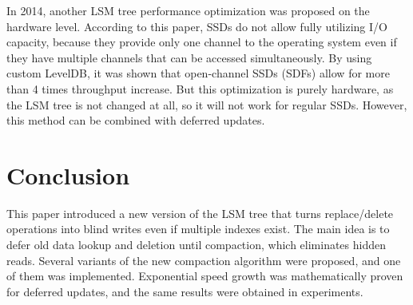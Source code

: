 \documentclass{vldb}
\begin{document}
In 2014, another LSM tree performance optimization was proposed
\cite{Wang:open_channel_ssd} on the hardware level. According to this paper, SSDs
do not allow fully utilizing I/O capacity, because they provide only one channel
to the operating system even if they have multiple channels that can be accessed
simultaneously. By using custom LevelDB, it was shown that open-channel SSDs
(SDFs) allow for more than 4 times throughput increase. But this optimization is
purely hardware, as the LSM tree is not changed at all, so it will not work for
regular SSDs. However, this method can be combined with deferred updates.

\section{Conclusion}

This paper introduced a new version of the LSM tree that turns replace/delete
operations into blind writes even if multiple indexes exist. The main idea is to
defer old data lookup and deletion until compaction, which eliminates hidden
reads. Several variants of the new compaction algorithm were proposed, and one
of them was implemented. Exponential speed growth was mathematically proven for
deferred updates, and the same results were obtained in experiments.


\end{document}
